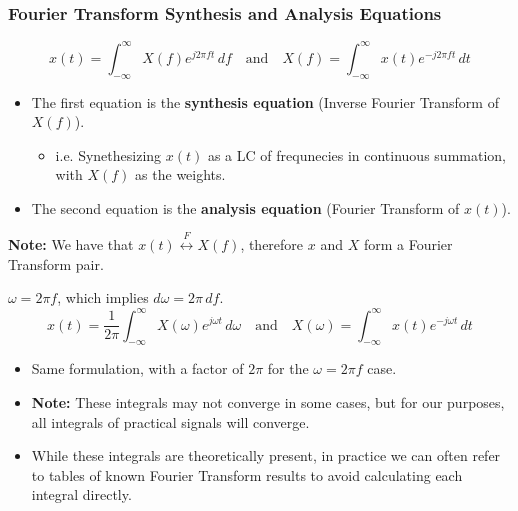 \subsubsection{Fourier Transform Synthesis and Analysis Equations}
\begin{definition}
    \begin{equation*}
        x(t) = \int_{-\infty}^{\infty} X(f) e^{j 2 \pi f t} \, df \quad \text{and} \quad X(f) = \int_{-\infty}^{\infty} x(t) e^{-j 2 \pi f t} \, dt
    \end{equation*}

    \begin{itemize}
        \item The first equation is the \textbf{synthesis equation} (Inverse Fourier Transform of \( X(f) \)).
        \begin{itemize}
            \item i.e. Synethesizing $x(t)$ as a LC of frequnecies in continuous summation, with $X(f)$ as the weights.
        \end{itemize}
        \item The second equation is the \textbf{analysis equation} (Fourier Transform of \( x(t) \)).
    \end{itemize}

    \textbf{Note:} We have that \( x(t) \overset{F}{\leftrightarrow} X(f) \), therefore \( x \) and \( X \) form a Fourier Transform pair.
\end{definition}

\begin{definition}
    \( \omega = 2 \pi f \), which implies \( d\omega = 2 \pi \, df \).
    \[
    x(t) = \frac{1}{2 \pi} \int_{-\infty}^{\infty} X(\omega) e^{j \omega t} \, d\omega \quad \text{and} \quad X(\omega) = \int_{-\infty}^{\infty} x(t) e^{-j \omega t} \, dt
    \]
    \begin{itemize}
        \item Same formulation, with a factor of \( 2 \pi \) for the \( \omega = 2 \pi f \) case.
    \end{itemize}
\end{definition}

\begin{warning}
    \begin{itemize}
        \item \textbf{Note:} These integrals may not converge in some cases, but for our purposes, all integrals of practical signals will converge.
        \item While these integrals are theoretically present, in practice we can often refer to tables of known Fourier Transform results to avoid calculating each integral directly.
    \end{itemize}
\end{warning}

